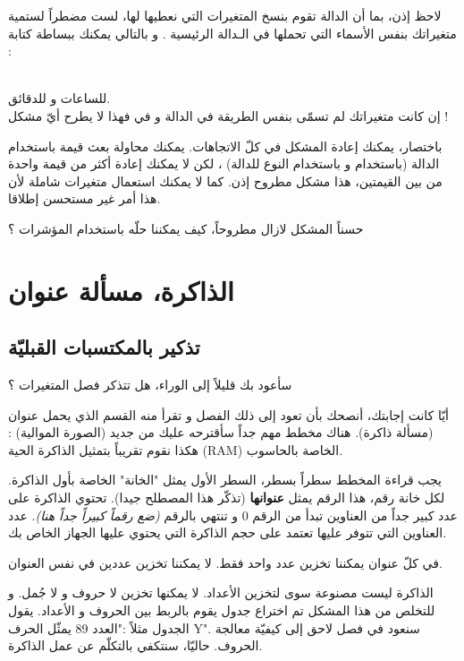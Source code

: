 \begin{information}
	لاحظ إذن، بما أن الدالة تقوم بنسخ المتغيرات التي نعطيها لها، لست مضطراً لستمية متغيراتك بنفس الأسماء التي تحملها في الـدالة الرئيسية
.
و بالتالي يمكنك ببساطة كتابة :

\\
للساعات و
للدقائق.\\
إن كانت متغيراتك لم تسمّى بنفس الطريقة في الدالة و في
فهذا لا يطرح أيّ مشكل !
\end{information}


باختصار، يمكنك إعادة المشكل في كلّ الاتجاهات. يمكنك محاولة بعث قيمة باستخدام الدالة (باستخدام
و باستخدام النوع
للدالة) ، لكن لا يمكنك إعادة أكثر من قيمة واحدة من بين القيمتين، هذا مشكل مطروح إذن. كما لا يمكنك استعمال متغيرات شاملة لأن هذا أمر غير مستحسن إطلاقا.

حسناً المشكل لازال مطروحاً، كيف يمكننا حلّه باستخدام المؤشرات ؟

\section{الذاكرة، مسألة عنوان}

\subsection{تذكير بالمكتسبات القبليّة}

سأعود بك قليلاً إلى الوراء، هل تتذكر فصل المتغيرات ؟

أيّا كانت إجابتك، أنصحك بأن تعود إلى ذلك الفصل و تقرأ منه القسم الذي يحمل عنوان (مسألة ذاكرة). هناك مخطط مهم جداً سأقترحه عليك من جديد (الصورة الموالية) :
هكذا نقوم تقريباً بتمثيل الذاكرة الحية
(\textenglish{RAM})
الخاصة بالحاسوب.

يجب قراءة المخطط سطراً بسطر، السطر الأول يمثل "الخانة" الخاصة بأول الذاكرة. لكل خانة رقم، هذا الرقم يمثل
\textbf{عنوانها}
(تذكّر هذا المصطلح جيدا). تحتوي الذاكرة على عدد كبير جداً من العناوين تبدأ من الرقم 0 و تنتهي بالرقم
\textit{(ضع رقماً كبيراً جداً هنا)}.
عدد العناوين التي تتوفر عليها تعتمد على حجم الذاكرة التي يحتوي عليها الجهاز الخاص بك.

في كلّ عنوان يمكننا تخزين عدد واحد فقط. لا يمكننا تخزين عددين في نفس العنوان.

الذاكرة ليست مصنوعة سوى لتخزين الأعداد. لا يمكنها تخزين لا حروف و لا جُمل. و للتخلص من هذا المشكل تم اختراع جدول يقوم بالربط بين الحروف و الأعداد. يقول الجدول مثلاً :"العدد 89 يمثّل الحرف
\textenglish{Y}".
سنعود في فصل لاحق إلى كيفيّة معالجة الحروف. حاليّا، سنتكفي بالتكلّم عن عمل الذاكرة.

